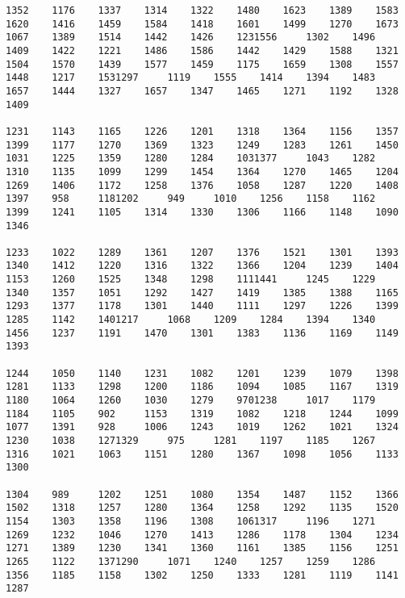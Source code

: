 \begin{verbatim}
1352    1176    1337    1314    1322    1480    1623    1389    1583    1620    1416    1459    1584    1418    1601    1499    1270    1673    1067    1389    1514    1442    1426    1231556     1302    1496    1409    1422    1221    1486    1586    1442    1429    1588    1321    1504    1570    1439    1577    1459    1175    1659    1308    1557    1448    1217    1531297     1119    1555    1414    1394    1483    1657    1444    1327    1657    1347    1465    1271    1192    1328    1409

1231    1143    1165    1226    1201    1318    1364    1156    1357    1399    1177    1270    1369    1323    1249    1283    1261    1450    1031    1225    1359    1280    1284    1031377     1043    1282    1310    1135    1099    1299    1454    1364    1270    1465    1204    1269    1406    1172    1258    1376    1058    1287    1220    1408    1397    958     1181202     949     1010    1256    1158    1162    1399    1241    1105    1314    1330    1306    1166    1148    1090    1346

1233    1022    1289    1361    1207    1376    1521    1301    1393    1340    1412    1220    1316    1322    1366    1204    1239    1404    1153    1260    1525    1348    1298    1111441     1245    1229    1340    1357    1051    1292    1427    1419    1385    1388    1165    1293    1377    1178    1301    1440    1111    1297    1226    1399    1285    1142    1401217     1068    1209    1284    1394    1340    1456    1237    1191    1470    1301    1383    1136    1169    1149    1393

1244    1050    1140    1231    1082    1201    1239    1079    1398    1281    1133    1298    1200    1186    1094    1085    1167    1319    1180    1064    1260    1030    1279    9701238     1017    1179    1184    1105    902     1153    1319    1082    1218    1244    1099    1077    1391    928     1006    1243    1019    1262    1021    1324    1230    1038    1271329     975     1281    1197    1185    1267    1316    1021    1063    1151    1280    1367    1098    1056    1133    1300

1304    989     1202    1251    1080    1354    1487    1152    1366    1502    1318    1257    1280    1364    1258    1292    1135    1520    1154    1303    1358    1196    1308    1061317     1196    1271    1269    1232    1046    1270    1413    1286    1178    1304    1234    1271    1389    1230    1341    1360    1161    1385    1156    1251    1265    1122    1371290     1071    1240    1257    1259    1286    1356    1185    1158    1302    1250    1333    1281    1119    1141    1287


\end{verbatim}
